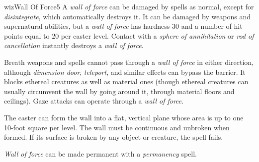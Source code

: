 \begin{spellcard}{wiz}{Wall Of Force}{5}
  A \emph{wall of force} can be damaged by spells as normal, except for
  \emph{disintegrate}, which automatically destroys it. It can be damaged
  by weapons and supernatural abilities, but a \emph{wall of force} has
  hardness 30 and a number of hit points equal to 20 per caster level.
  Contact with a \emph{sphere of annihilation} or \emph{rod of
    cancellation} instantly destroys a \emph{wall of force}.

  Breath weapons and spells cannot pass through a \emph{wall of force} in
  either direction, although \emph{dimension door}, \emph{teleport}, and
  similar effects can bypass the barrier. It blocks ethereal creatures as
  well as material ones (though ethereal creatures can usually circumvent
  the wall by going around it, through material floors and ceilings). Gaze
  attacks can operate through a \emph{wall of force}.

  The caster can form the wall into a flat, vertical plane whose area is
  up to one 10-foot square per level. The wall must be continuous and
  unbroken when formed. If its surface is broken by any object or
  creature, the spell fails.

  \emph{Wall of force} can be made permanent with a \emph{permanency}
  spell.

\end{spellcard}
